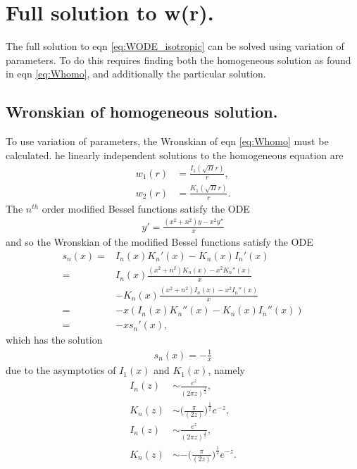 \documentclass[twocolumn,amsmath,amssymb,aps]{revtex4-1}%
\begin{document}
\section{Full solution to w(r). \label{app:fullWsolution}}
The full solution to eqn \ref{eq:WODE_isotropic} can be solved using variation
of parameters. To do this requires finding both the homogeneous solution
as found in eqn \ref{eq:Whomo}, and additionally the particular solution.

\subsection{Wronskian of homogeneous solution.}
To use variation of parameters, the Wronskian of eqn \ref{eq:Whomo} must be
calculated. he linearly independent solutions to the homogeneous equation are
\begin{subequations}
  \label{eqs:linindependentWhomo}
  \begin{align}
    w_1(r)&=\frac{I_1(\sqrt{\Pi}r)}{r},\\
    w_2(r)&=\frac{K_1(\sqrt{\Pi}r)}{r}.
  \end{align}
\end{subequations}
The $n^{th}$ order modified Bessel functions satisfy the ODE
\begin{align}
  y'=\frac{(x^2+n^2)y-x^2y''}{x}
\end{align}
and so the Wronskian of the modified Bessel functions satisfy the ODE
\begin{align}
  s_n(x)=
  & I_n(x)K_n'(x)-K_n(x)I_n'(x)\nonumber\\
  =& I_n(x)\frac{(x^2+n^2)K_n(x)-x^2K_n''(x)}{x}\nonumber\\
  & -K_n(x)\frac{(x^2+n^2)I_n(x)-x^2I_n''(x)}{x}\nonumber\\
  =& -x(I_n(x)K_n''(x)-K_n(x)I_n''(x))\nonumber\\
  =& - x s_n'(x),
\end{align}
which has the solution
\begin{align}
  s_n(x)=-\frac{1}{x}
\end{align}
due to the asymptotics of $I_1(x)$ and $K_1(x)$, namely
\begin{align}
  I_n(z)&\sim\frac{e^z}{(2\pi z)^{\frac{1}{2}}},\\
  K_n(z)&\sim\bigg(\frac{\pi}{(2 z)}\bigg)^{\frac{1}{2}}e^{-z},\\
  I_n(z)&\sim\frac{e^z}{(2\pi z)^{\frac{1}{2}}},\\
  K_n(z)&\sim-\bigg(\frac{\pi}{(2 z)}\bigg)^{\frac{1}{2}}e^{-z}.
\end{align}
\end{document}
